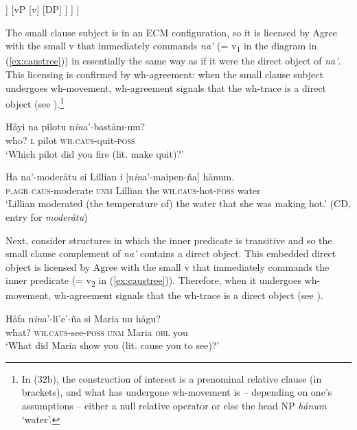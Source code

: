 \documentclass[output=paper,
modfonts
]{LSP/langsci}
\begin{document}
\begin{exe}
\begin{xlist}
\ea\label{ex:caustree}
	\begin{forest}
		[v\1
			[v\sub{1}]
			[VP
				[V
					[na']
				]
				[vP
					[v\1
						[v\sub{2}]
						[VP]
					]
					[DP]
				]
			]
		]
	\end{forest}
\z

The small clause subject is in an ECM configuration, so it is licensed
by Agree with the small v that immediately commands \emph{na'} (=
v\textsubscript{1} in the diagram in (\ref{ex:caustree})) in essentially the same way
as if it were the direct object of \emph{na'}. This licensing is
confirmed by wh-agreement: when the small clause subject undergoes
wh-movement, wh-agreement signals that the wh-trace is a direct object
(see \citealt[82, 164]{gibson1980}).\footnote{In (32b), the construction of
  interest is a prenominal relative clause (in brackets), and what has
  undergone wh-movement is -- depending on one's assumptions -- either a
  null relative operator or else the head NP \emph{hånum} `water'.}

\ea
\ea
\gll Håyi na pilotu n\emph{in}a'-baståm-mu?\\
who? \textsc{l} pilot \textsc{wh.caus}-quit-\textsc{poss}\\
\glt `Which pilot did you fire (lit. make quit)?'

\ex \gll Ha na'-moderåtu si Lillian i {[}n\emph{in}a'-maipen-ña{]} hånum.\\
\textsc{p.agr} \textsc{caus-}moderate \textsc{unm} Lillian the \textsc{wh.caus-}hot-\textsc{poss} water\\
\glt `Lillian moderated (the temperature of) the water that she was making
hot.' (CD, entry for \emph{moderåtu})
\z
\z

Next, consider structures in which the inner predicate is transitive and
so the small clause complement of \emph{na'} contains a direct object.
This embedded direct object is licensed by Agree with the small v that
immediately commands the inner predicate (= v\textsubscript{2} in (\ref{ex:caustree})).
Therefore, when it undergoes wh-movement, wh-agreement signals that the
wh-trace is a direct object (see \citealt[197]{gibson1980}).

\ea
\gll Håfa n\emph{in}a'-li'e'-ña si Maria nu hågu?\\
what? \textsc{wh.caus-}see-\textsc{poss} \textsc{unm} Maria \textsc{obl} you\\
\glt `What did Maria show you (lit. cause you to see)?'
\z


\end{xlist}
\end{exe}
\end{document}
